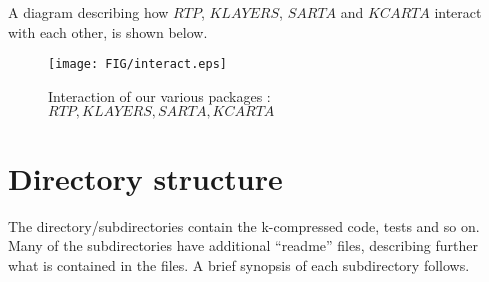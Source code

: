 \documentclass[11pt]{article}
\begin{document}
A diagram describing how $RTP$, $KLAYERS$, $SARTA$ and $KCARTA$ interact with
each other, is shown below.
\begin{figure}
\texttt{[image: FIG/interact.eps]}
\caption{Interaction of our various packages : $RTP, KLAYERS, SARTA, KCARTA$}
\end{figure}

\section{Directory structure}

The directory/subdirectories contain the k-compressed code, tests
and so on.  Many of the subdirectories have additional ``readme''
files, describing further what is contained in the files. A brief
synopsis of each subdirectory follows.
\end{document}
